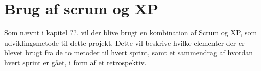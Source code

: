 \section{Brug af scrum og XP}\label{sec:brugafscrum}
Som nævnt i kapitel ??, vil der blive brugt en kombination af Scrum og XP, 
som udviklingsmetode til dette projekt. Dette vil beskrive hvilke elementer der er blevet brugt fra de
to metoder til hvert sprint, samt et sammendrag af hvordan hvert sprint er gået, i form af et retrospektiv.




